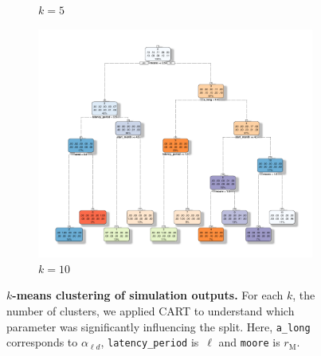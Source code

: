 \documentclass[10pt]{article}
\newcommand{\ald}{\alpha_{\ell d}}
\newcommand{\mooreRange}{r_\mathrm{M}}
\theoremstyle{definition}
\begin{document}
\begin{figure}[ht]
\begin{subfigure}[b]{.47\textwidth}
\caption{$k=5$}
\end{subfigure}
\begin{subfigure}[b]{.6\textwidth}
\includegraphics[width=\textwidth]{../clustering/results/kmeans/cart_kmeans_10.pdf}
\caption{$k=10$}
\end{subfigure}
\caption{\textbf{$k$-means clustering of simulation outputs.} For each $k$,
the number of clusters, we applied CART to understand which parameter was
significantly influencing the split. Here, \texttt{a\_long} corresponds to
$\ald$, \texttt{latency\_period} is~$\ell$ and \texttt{moore} is
$\mooreRange$.
\label{fig:cartkmeans}}
\end{figure}
\end{document}
